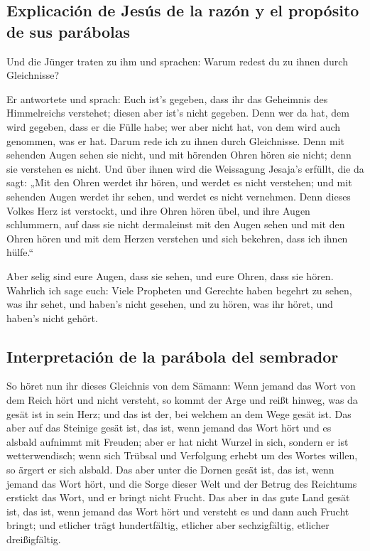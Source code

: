 \hypertarget{explicaciuxf3n-de-jesuxfas-de-la-razuxf3n-y-el-propuxf3sito-de-sus-paruxe1bolas}{%
\subsection{Explicación de Jesús de la razón y el propósito de sus
parábolas}\label{explicaciuxf3n-de-jesuxfas-de-la-razuxf3n-y-el-propuxf3sito-de-sus-paruxe1bolas}}

 Und die Jünger traten zu ihm und sprachen: Warum redest
du zu ihnen durch Gleichnisse?

 Er antwortete und sprach: Euch ist's gegeben, dass ihr
das Geheimnis des Himmelreichs verstehet; diesen aber ist's nicht
gegeben.  Denn wer da hat, dem wird gegeben, dass er die
Fülle habe; wer aber nicht hat, von dem wird auch genommen, was er hat.
 Darum rede ich zu ihnen durch Gleichnisse. Denn mit
sehenden Augen sehen sie nicht, und mit hörenden Ohren hören sie nicht;
denn sie verstehen es nicht.  Und über ihnen wird die
Weissagung Jesaja's erfüllt, die da sagt: „Mit den Ohren werdet ihr
hören, und werdet es nicht verstehen; und mit sehenden Augen werdet ihr
sehen, und werdet es nicht vernehmen.  Denn dieses Volkes
Herz ist verstockt, und ihre Ohren hören übel, und ihre Augen
schlummern, auf dass sie nicht dermaleinst mit den Augen sehen und mit
den Ohren hören und mit dem Herzen verstehen und sich bekehren, dass ich
ihnen hülfe.``

 Aber selig sind eure Augen, dass sie sehen, und eure
Ohren, dass sie hören.  Wahrlich ich sage euch: Viele
Propheten und Gerechte haben begehrt zu sehen, was ihr sehet, und
haben's nicht gesehen, und zu hören, was ihr höret, und haben's nicht
gehört.

\hypertarget{interpretaciuxf3n-de-la-paruxe1bola-del-sembrador}{%
\subsection{Interpretación de la parábola del
sembrador}\label{interpretaciuxf3n-de-la-paruxe1bola-del-sembrador}}

 So höret nun ihr dieses Gleichnis von dem Sämann:
 Wenn jemand das Wort von dem Reich hört und nicht
versteht, so kommt der Arge und reißt hinweg, was da gesät ist in sein
Herz; und das ist der, bei welchem an dem Wege gesät ist.
 Das aber auf das Steinige gesät ist, das ist, wenn
jemand das Wort hört und es alsbald aufnimmt mit Freuden;
 aber er hat nicht Wurzel in sich, sondern er ist
wetterwendisch; wenn sich Trübsal und Verfolgung erhebt um des Wortes
willen, so ärgert er sich alsbald.  Das aber unter die
Dornen gesät ist, das ist, wenn jemand das Wort hört, und die Sorge
dieser Welt und der Betrug des Reichtums erstickt das Wort, und er
bringt nicht Frucht.  Das aber in das gute Land gesät
ist, das ist, wenn jemand das Wort hört und versteht es und dann auch
Frucht bringt; und etlicher trägt hundertfältig, etlicher aber
sechzigfältig, etlicher dreißigfältig.

